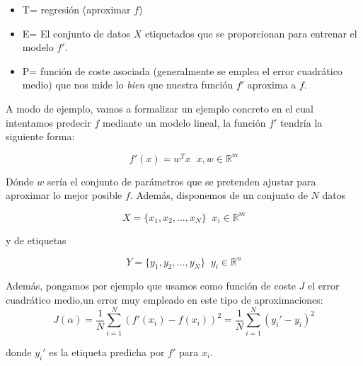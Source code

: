             \begin{itemize}
                \item T= regresión (aproximar $f$)
                \item E= El conjunto de datos $X$ etiquetados que se proporcionan para entrenar el modelo $f'$.
                \item P= función de coste asociada (generalmente se emplea el error cuadrático medio) que nos mide lo \textit{bien} que nuestra función $f'$ aproxima a $f$.
            \end{itemize}
            
            \medskip 

            \noindent A modo de ejemplo, vamos a formalizar un ejemplo concreto en el cual intentamos predecir $f$ mediante un modelo lineal, la función $f'$ tendría la siguiente forma: 

            \begin{equation}
                f'(x)= w^T x \; \; x,w \in \mathbb{R}^m
            \end{equation}

            \noindent Dónde $w$ sería el conjunto de parámetros que se pretenden ajustar para aproximar lo mejor posible $f$. Además, disponemos de un conjunto de $N$ datos 
            
            \begin{equation}
                X= \lbrace x_1, x_2 , \ldots , x_N \rbrace \; \; x_i \in \mathbb{R}^m
            \end{equation}

            \noindent y de etiquetas 

            \begin{equation}
                Y= \lbrace y_1, y_2 , \ldots , y_N \rbrace \; \; y_i \in \mathbb{R}^n
            \end{equation}

            \noindent Además, pongamos por ejemplo que usamos como función de coste $J$ el error cuadrático medio,un error muy empleado en este tipo de aproximaciones:
            \begin{equation}
               J(\alpha)= \frac{1}{N} \sum_{i=1}^{N}(f'(x_i) - f(x_i))^2 = \frac{1}{N} \sum_{i=1}^{N}(y_i' - y_i)^2
            \end{equation}

            \noindent donde $y_i'$ es la etiqueta predicha por $f'$ para $x_i$.

            \medskip

